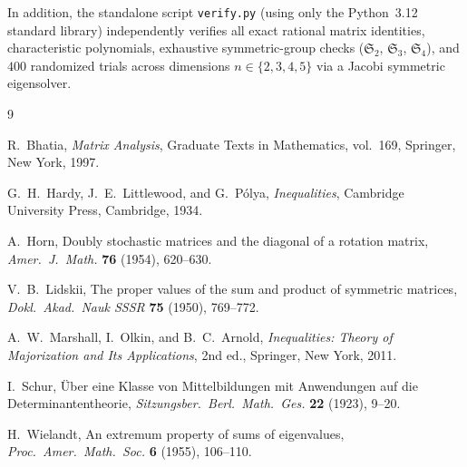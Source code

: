 \documentclass[11pt]{article}
\theoremstyle{definition}
\theoremstyle{remark}
\begin{document}
In addition, the standalone script \texttt{verify.py} (using only the Python~3.12
standard library) independently verifies all exact rational matrix identities,
characteristic polynomials, exhaustive symmetric-group checks ($\mathfrak{S}_2$,
$\mathfrak{S}_3$, $\mathfrak{S}_4$), and $400$ randomized trials across dimensions
$n \in \{2,3,4,5\}$ via a Jacobi symmetric eigensolver.

\begin{thebibliography}{9}

R.~Bhatia,
\emph{Matrix Analysis},
Graduate Texts in Mathematics, vol.~169, Springer, New York, 1997.

G.~H.~Hardy, J.~E.~Littlewood, and G.~P\'olya,
\emph{Inequalities},
Cambridge University Press, Cambridge, 1934.

A.~Horn,
Doubly stochastic matrices and the diagonal of a rotation matrix,
\emph{Amer.\ J.\ Math.} \textbf{76} (1954), 620--630.

V.~B.~Lidskii,
The proper values of the sum and product of symmetric matrices,
\emph{Dokl.\ Akad.\ Nauk SSSR} \textbf{75} (1950), 769--772.

A.~W.~Marshall, I.~Olkin, and B.~C.~Arnold,
\emph{Inequalities: Theory of Majorization and Its Applications},
2nd ed., Springer, New York, 2011.

I.~Schur,
\"Uber eine Klasse von Mittelbildungen mit Anwendungen auf die Determinantentheorie,
\emph{Sitzungsber.\ Berl.\ Math.\ Ges.} \textbf{22} (1923), 9--20.

H.~Wielandt,
An extremum property of sums of eigenvalues,
\emph{Proc.\ Amer.\ Math.\ Soc.} \textbf{6} (1955), 106--110.

\end{thebibliography}
\end{document}
